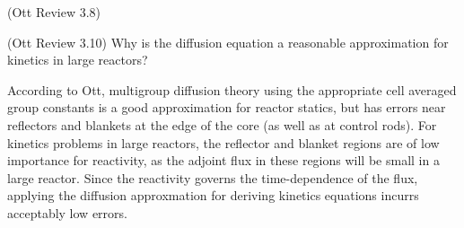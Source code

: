 \documentclass[11pt,addpoints,answers]{exam}
\begin{document}
\begin{questions}
\begin{parts}
        \end{parts}

        \question (Ott Review 3.8)


        \question[10] (Ott Review 3.10) Why is the diffusion equation a reasonable 
        approximation for kinetics in large reactors?
        \begin{solution}
            According to Ott, multigroup diffusion theory using the appropriate
            cell averaged group constants is a good approximation for reactor
            statics, but has errors near reflectors and blankets at the edge of
            the core (as well as at control rods). For kinetics problems in
            large reactors, the reflector and blanket regions are of low
            importance for reactivity, as the adjoint flux in these regions will
            be small in a large reactor. Since the reactivity governs the
            time-dependence of the flux, applying the diffusion approxmation for
            deriving kinetics equations incurrs acceptably low errors.
        \end{solution}


\end{questions}
\end{document}
